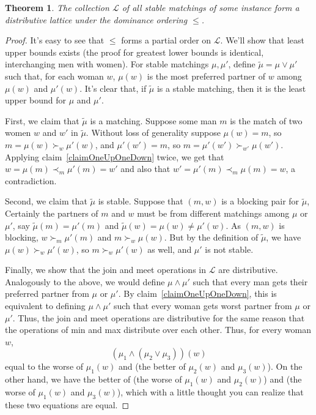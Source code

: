 \documentclass[12pt]{article}
\renewcommand{\L}{\mathcal{L}}
\newtheorem{theorem}[definition]{Theorem}
\begin{document}
  \begin{theorem}
    The collection $\L$ of all stable matchings of some instance
    form a distributive lattice under the dominance ordering $\le$.
  \end{theorem}
  \begin{proof}
    It's easy to see that $\le$ forms a partial order on $\L$.
    We'll show that least upper bounds exists (the proof for greatest lower
    bounds is identical, interchanging men with women).
    For stable matchings $\mu,\mu'$, define
    $\tilde\mu = \mu\vee\mu'$ such that, for each woman $w$,
    $\mu(w)$ is the most preferred partner
    of $w$ among $\mu(w)$ and $\mu'(w)$.
    It's clear that, if $\tilde\mu$ is a stable matching,
    then it is the least upper bound for $\mu$ and $\mu'$.

    First, we claim that $\tilde\mu$ is a matching.
    Suppose some man $m$ is the match of two women $w$ and $w'$ in
    $\tilde\mu$. Without loss of generality suppose $\mu(w)=m$,
    so $m=\mu(w)\succ_w \mu'(w)$,
    and $\mu'(w')=m$, so $m=\mu'(w')\succ_{w'}\mu(w')$.
    Applying claim~\ref{claimOneUpOneDown} twice,
    we get that $w=\mu(m)\prec_m \mu'(m)=w'$
    and also that $w'=\mu'(m)\prec_m \mu(m)=w$,
    a contradiction.

    Second, we claim that $\tilde\mu$ is stable.
    Suppose that $(m,w)$ is a blocking pair for $\tilde\mu$,
    Certainly the partners of $m$ and $w$ must be from different matchings among
    $\mu$ or $\mu'$, say $\tilde\mu(m)=\mu'(m)$ and 
    $\tilde\mu(w)=\mu(w)\ne \mu'(w)$.
    As $(m,w)$ is blocking, $w\succ_m\mu'(m)$ and $m\succ_w\mu(w)$.
    But by the definition of $\tilde\mu$, we have $\mu(w)\succ_w\mu'(w)$,
    so $m\succ_w\mu'(w)$ as well, and $\mu'$ is not stable.

    Finally, we show that the join and meet operations in $\L$ are distributive.
    Analogously to the above, we would define $\mu\wedge\mu'$ such that every
    man gets their preferred partner from $\mu$ or $\mu'$.
    By claim~\ref{claimOneUpOneDown}, this is equivalent to defining
    $\mu\wedge\mu'$ such that every woman
    gets worst partner from $\mu$ or $\mu'$.
    Thus, the join and meet operations are distributive for the same reason that
    the operations of min and max distribute over each other.
    Thus, for every woman $w$,
    \[ (\mu_1 \wedge (\mu_2 \vee \mu_3) )(w) \]
    equal to the worse of $\mu_1(w)$ and (the better of $\mu_2(w)$ and
    $\mu_3(w)$).
    On the other hand, we have the better of
    (the worse of $\mu_1(w)$ and $\mu_2(w)$)
    and (the worse of $\mu_1(w)$ and $\mu_3(w)$),
    which with a little thought you can realize that these two equations are
    equal.
  \end{proof}
\end{document}
